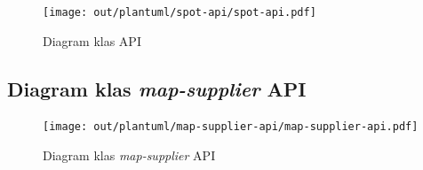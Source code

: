\begin{figure}[H]
	\begin{center}
		\texttt{[image: out/plantuml/spot-api/spot-api.pdf]}
	\end{center}
    \caption{Diagram klas  API}
\end{figure}

\subsection{Diagram klas \emph{map-supplier} API}

\begin{figure}[H]
	\begin{center}
		\texttt{[image: out/plantuml/map-supplier-api/map-supplier-api.pdf]}
	\end{center}
    \caption{Diagram klas \emph{map-supplier} API}
\end{figure}


